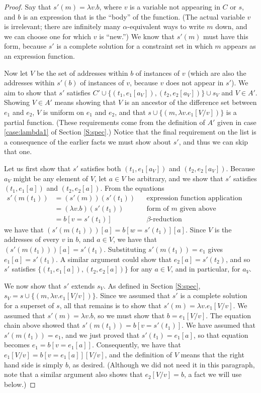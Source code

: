 \documentclass{article}
\begin{document}
\begin{proof}
Say that $s'(m)=\lambda v.b$, where $v$ is a variable not appearing in $C$ or $s$, and $b$ is an expression that is the ``body'' of the function.  (The actual variable $v$ is irrelevant; there are infinitely many $\alpha$-equivalent ways to write $m$ down, and we can choose one for which $v$ is ``new.'')  We know that $s'(m)$ must have this form, because $s'$ is a complete solution for a constraint set in which $m$ appears as an expression function.

Now let $V$ be the set of addresses within $b$ of instances of $v$ (which are also the addresses within $s'(b)$ of instances of $v$, because $v$ does not appear in $s'$).  We aim to show that $s'$ satisfies $C'\cup\{(t_1,e_1[a_V]),(t_2,e_2[a_V])\}\cup s_V$ and $V\in A'$.  Showing $V\in A'$ means showing that $V$ is an ancestor of the difference set between $e_1$ and $e_2$, $V$ is uniform on $e_1$ and $e_2$, and that $s\cup\{(m,\lambda v.e_1[V/v])\}$ is a partial function.  (These requirements come from the definition of $A'$ given in case \ref{case:lambda1} of Section \ref{S:spec}.)  Notice that the final requirement on the list is a consequence of the earlier facts we must show about $s'$, and thus we can skip that one.

Let us first show that $s'$ satisfies both $(t_1,e_1[a_V])$ and $(t_2,e_2[a_V])$.  Because $a_V$ might be any element of $V$, let $a\in V$ be arbitrary, and we show that $s'$ satisfies $(t_1,e_1[a])$ and $(t_2,e_2[a])$.  From the equations
\begin{align*}
	s'(m(t_1))
	&=	(s'(m))(s'(t_1))		&&\text{expression function application structure}	\\
	&=	(\lambda v.b)(s'(t_1))	&&\text{form of $m$ given above}					\\
	&=	b[v=s'(t_1)]			&&\text{$\beta$-reduction}
\end{align*}
we have that $(s'(m(t_1)))[a]=b[w=s'(t_1)][a]$.  Since $V$ is the addresses of every $v$ in $b$, and $a\in V$, we have that $(s'(m(t_1)))[a]=s'(t_1)$.  Substituting $s'(m(t_1))=e_1$ gives $e_1[a]=s'(t_1)$.  A similar argument could show that $e_2[a]=s'(t_2)$, and so $s'$ satisfies $\{(t_1,e_1[a]),(t_2,e_2[a])\}$ for any $a\in V$, and in particular, for $a_V$.

We now show that $s'$ extends $s_V$.  As defined in Section \ref{S:spec}, $s_V=s\cup\{(m,\lambda v.e_1[V/v])\}$.  Since we assumed that $s'$ is a complete solution for a superset of $s$, all that remains is to show that $s'(m)=\lambda v.e_1[V/v]$.  We assumed that $s'(m)=\lambda v.b$, so we must show that $b=e_1[V/v]$.  The equation chain above showed that $s'(m(t_1))=b[v=s'(t_1)]$.  We have assumed that $s'(m(t_1))=e_1$, and we just proved that $s'(t_1)=e_1[a]$, so that equation becomes $e_1=b[v=e_1[a]]$.  Consequently, we have that $e_1[V/v]=b[v=e_1[a]][V/v]$, and the definition of $V$ means that the right hand side is simply $b$, as desired.  (Although we did not need it in this paragraph, note that a similar argument also shows that $e_2[V/v]=b$, a fact we will use below.)


\end{proof}
\end{document}
